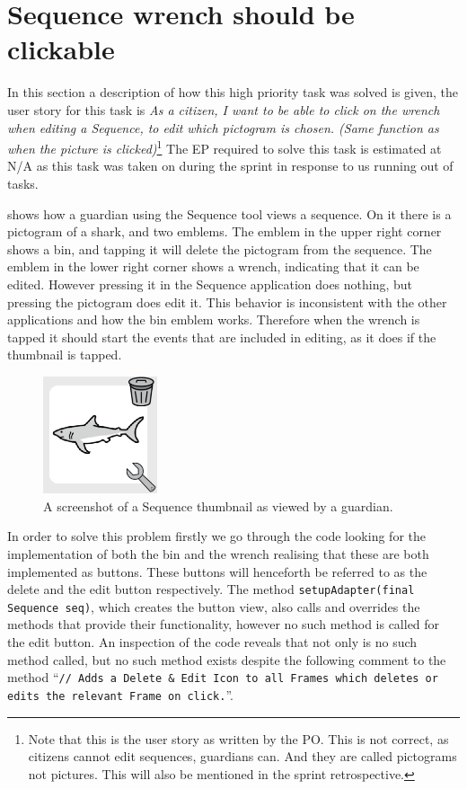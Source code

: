 \section{Sequence wrench should be clickable}
In this section a description of how this high priority task was solved is given, the user story for this task is \textit{As a citizen, I want to be able to click on the wrench when editing a Sequence, to edit which pictogram is chosen. (Same function as when the picture is clicked)}\footnote{Note that this is the user story as written by the PO. This is not correct, as citizens cannot edit sequences, guardians can. And they are called pictograms not pictures. This will also be mentioned in the sprint retrospective. } 
The EP required to solve this task is estimated at N/A as this task was taken on during the sprint in response to us running out of tasks.

 shows how a guardian using the Sequence tool views a sequence.
On it there is a pictogram of a shark, and two emblems. 
The emblem in the upper right corner shows a bin, and tapping it will delete the pictogram from the sequence. 
The emblem in the lower right corner shows a wrench, indicating that it can be edited.
However pressing it in the Sequence application does nothing, but pressing the pictogram does edit it. 
This behavior is inconsistent with the other applications and how the bin emblem works. 
Therefore when the wrench is tapped it should start the events that are included in editing, as it does if the thumbnail is tapped.
\begin{figure}
    \centering
    \includegraphics[width=0.3\textwidth]{figures/img/screenshots/Sequence_pictogram.png} 
    \caption{A screenshot of a Sequence thumbnail as viewed by a guardian.}
    \label{fig:seq_wrench} 
    \vspace{-5pt}
\end{figure}
\bigskip
\noindent
In order to solve this problem firstly we go through the code looking for the implementation of both the bin and the wrench realising that these are both implemented as buttons.
These buttons will henceforth be referred to as the delete and the edit button respectively.
The method \texttt{setupAdapter(final Sequence seq)}, which creates the button view, also calls and overrides the methods that provide their functionality, however no such method is called for the edit button.
An inspection of the code reveals that not only is no such method called, but no such method exists despite the following comment to the method ``\texttt{// Adds a Delete \& Edit Icon to all Frames which deletes or edits the relevant Frame on click.}''.

